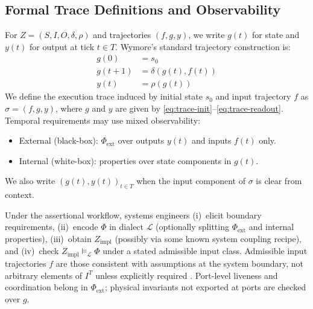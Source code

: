 \subsection{Formal Trace Definitions and Observability}
\label{sec:trace-observability}
For $Z = (S, I, O, \delta, \rho)$ and trajectories $(f, g, y)$, we write $g(t)$ for state and $y(t)$ for output at tick $t \in T$. Wymore's standard trajectory construction is:
\begin{align}
    g(0) &= s_0 \label{eq:trace-init}\\
    g(t+1) &= \delta(g(t), f(t)) \label{eq:trace-step}\\
    y(t) &= \rho(g(t)) \label{eq:trace-readout}
\end{align}
We define the execution trace induced by initial state $s_0$ and input trajectory $f$ as $\sigma = (f, g, y)$, where $g$ and $y$ are given by \eqref{eq:trace-init}--\eqref{eq:trace-readout}. Temporal requirements may use mixed observability:
\begin{itemize}
    \item External (black-box): $\Phi_{\text{ext}}$ over outputs $y(t)$ and inputs $f(t)$ only.
    \item Internal (white-box): properties over state components in $g(t)$.
\end{itemize}
We also write $(g(t), y(t))_{t \in T}$ when the input component of $\sigma$ is clear from context.

Under the assertional workflow, systems engineers (i)~elicit boundary requirements, (ii)~encode $\Phi$ in dialect $\mathcal{L}$ (optionally splitting $\Phi_{\text{ext}}$ and internal properties), (iii)~obtain $Z_{\text{impl}}$ (possibly via some known system coupling recipe), and (iv)~check $Z_{\text{impl}} \models_{\mathcal{L}} \Phi$ under a stated admissible input class. Admissible input trajectories $f$ are those consistent with assumptions at the system boundary, not arbitrary elements of $I^T$ unless explicitly required \parencite{salado2019mbse}. Port-level liveness and coordination belong in $\Phi_{\text{ext}}$; physical invariants not exported at ports are checked over $g$.


